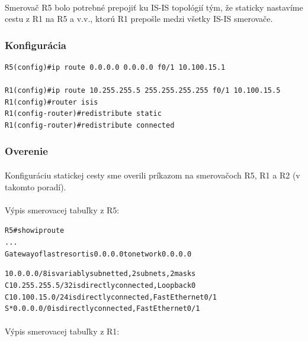 \documentclass[12pt,twoside,a4paper]{report}
\begin{document}
\paragraph{}
Smerovač R5 bolo potrebné prepojiť ku IS-IS topológií tým, že staticky nastavíme cestu z R1 na R5 a v.v., ktorú R1 prepošle medzi všetky IS-IS smerovače.

\subsubsection{Konfigurácia}
\noindent
{\selectfont
\begin{small}
\begin{verbatim}
R5(config)#ip route 0.0.0.0 0.0.0.0 f0/1 10.100.15.1

R1(config)#ip route 10.255.255.5 255.255.255.255 f0/1 10.100.15.5
R1(config)#router isis
R1(config-router)#redistribute static
R1(config-router)#redistribute connected
\end{verbatim}
\end{small}
}

\subsubsection{Overenie}
\paragraph{}
Konfiguráciu statickej cesty sme overili príkazom  na smerovačoch R5, R1 a R2 (v takomto poradí).

\paragraph{}
Výpis smerovacej tabuľky z R5:

\noindent
{\selectfont
\begin{small}
\begin{alltt}
R5#show ip route
...
Gateway of last resort is 0.0.0.0 to network 0.0.0.0

     10.0.0.0/8 is variably subnetted, 2 subnets, 2 masks
C       10.255.255.5/32 is directly connected, Loopback0
C       10.100.15.0/24 is directly connected, FastEthernet0/1
S*   0.0.0.0/0 is directly connected, FastEthernet0/1
\end{alltt}
\end{small}
}

\paragraph{}
Výpis smerovacej tabuľky z R1:
\end{document}
